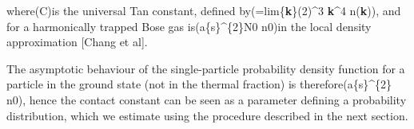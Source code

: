 where(C\infty)is the universal Tan constant, defined
by(=\textrm{lim}\{\textbar{}\textbf{k}\textbar{}\to\infty\}(2\pi)\^{}3
\textbar{}\textbf{k}\textbar\^{}4 n(\textbf{k})), and for a harmonically
trapped Bose gas is(a\{s\}\^{}\{2\}N0 n0)in the local
density approximation {[}Chang et al{]}.

The asymptotic behaviour of the single-particle probability density
function for a particle in the ground state (not in the thermal
fraction) is therefore(a\{s\}\^{}\{2\} n0), hence the
contact constant can be seen as a parameter defining a probability
distribution, which we estimate using the procedure described in the
next section.
